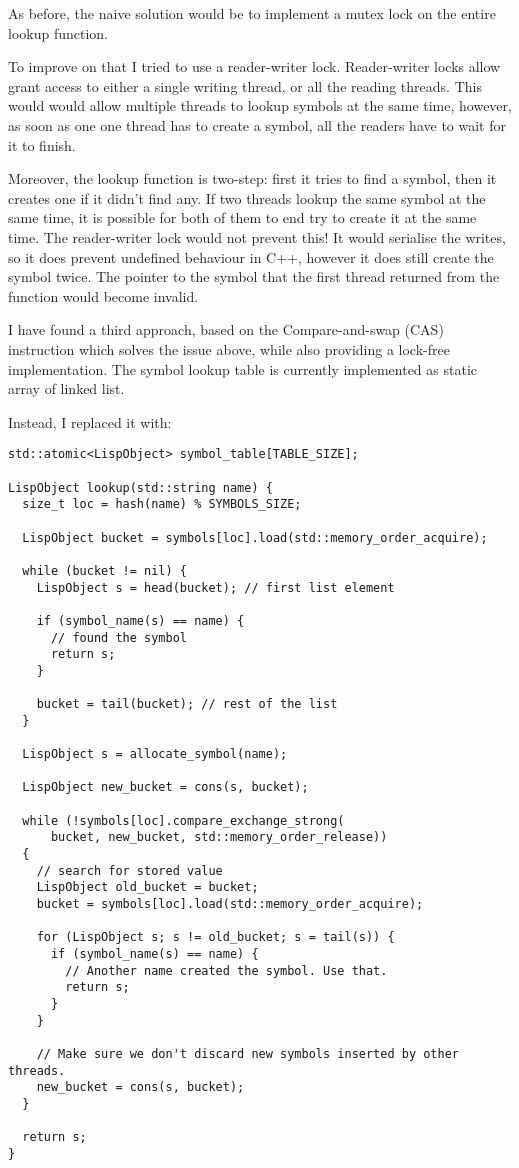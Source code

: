 As before, the naive solution would be to implement a mutex lock on the entire
lookup function.

To improve on that I tried to use a reader-writer lock. Reader-writer locks allow grant access
to either a single writing thread, or all the reading threads. This would would allow multiple
threads to lookup symbols at the same time, however, as soon as one one thread has to create a
symbol, all the readers have to wait for it to finish.

Moreover, the lookup function is two-step: first it tries to find a symbol, then it creates one
if it didn't find any. If two threads lookup the same symbol at the same time, it is possible for
both of them to end try to create it at the same time. The reader-writer lock would not prevent this!
It would serialise the writes, so it does prevent undefined behaviour in C++, however it does still
create the symbol twice. The pointer to the symbol that the first thread returned from the function
would become invalid.

I have found a third approach, based on the Compare-and-swap (CAS) instruction which solves the issue
above, while also providing a lock-free implementation. The symbol lookup table is currently implemented
as static array of linked list.

Instead, I replaced it with:
\begin{verbatim}
std::atomic<LispObject> symbol_table[TABLE_SIZE];

LispObject lookup(std::string name) {
  size_t loc = hash(name) % SYMBOLS_SIZE;

  LispObject bucket = symbols[loc].load(std::memory_order_acquire);

  while (bucket != nil) {
    LispObject s = head(bucket); // first list element

    if (symbol_name(s) == name) {
      // found the symbol
      return s;
    }

    bucket = tail(bucket); // rest of the list
  }

  LispObject s = allocate_symbol(name);

  LispObject new_bucket = cons(s, bucket);

  while (!symbols[loc].compare_exchange_strong(
      bucket, new_bucket, std::memory_order_release))
  {
    // search for stored value
    LispObject old_bucket = bucket;
    bucket = symbols[loc].load(std::memory_order_acquire);

    for (LispObject s; s != old_bucket; s = tail(s)) {
      if (symbol_name(s) == name) {
        // Another name created the symbol. Use that.
        return s;
      }
    }

    // Make sure we don't discard new symbols inserted by other threads.
    new_bucket = cons(s, bucket);
  }

  return s;
}
\end{verbatim}

